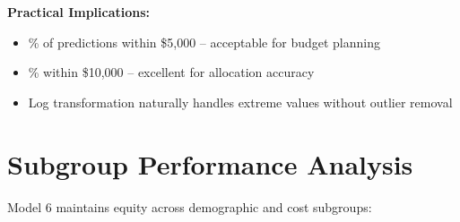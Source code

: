 \textbf{Practical Implications:}
\begin{itemize}
    \item \ModelSixWithinFiveK{}\% of predictions within \$5,000 -- acceptable for budget planning
    \item \ModelSixWithinTenK{}\% within \$10,000 -- excellent for allocation accuracy
    \item Log transformation naturally handles extreme values without outlier removal
\end{itemize}

\section{Subgroup Performance Analysis}

Model 6 maintains equity across demographic and cost subgroups:

